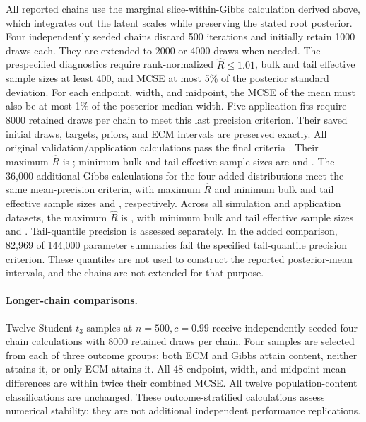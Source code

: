 \documentclass[11pt]{article}
\begin{document}
All reported chains use the marginal slice-within-Gibbs calculation derived
above, which integrates out the latent scales while preserving the stated
root posterior. Four independently seeded chains discard 500 iterations
and initially retain 1000 draws each. They are extended to 2000 or 4000
draws when needed. The prespecified diagnostics require rank-normalized
\(\widehat R\le1.01\), bulk and tail effective sample sizes at least 400,
and MCSE at most 5\% of the posterior standard deviation. For each endpoint,
width, and midpoint, the MCSE of the mean must also be at most 1\% of the
posterior median width. Five application fits require 8000 retained draws per
chain to meet this last precision criterion. Their saved initial draws,
targets, priors, and ECM intervals are preserved exactly.
All \MTIFullDatasets{} original validation/application calculations pass the final
criteria \citep{VehtariEtAl2021Rhat}. Their maximum \(\widehat R\) is \MTIFullRhat{}; minimum bulk and
tail effective sample sizes are \MTIFullBulkESS{} and \MTIFullTailESS{}.
The 36,000 additional Gibbs calculations for the four added distributions
meet the same mean-precision criteria, with maximum \(\widehat R\)
\MTIGibbsAddedRhat{} and minimum bulk and tail effective sample sizes
\MTIGibbsAddedBulkESS{} and \MTIGibbsAddedTailESS{}, respectively.
Across all \MTIGibbsAssessedDatasets{} simulation and application datasets,
the maximum \(\widehat R\) is \MTIGibbsAllRhat{}, with minimum bulk and tail
effective sample sizes \MTIGibbsAllBulkESS{} and \MTIGibbsAllTailESS{}.
Tail-quantile precision is assessed separately. In the added comparison,
82,969 of 144,000 parameter summaries fail the specified tail-quantile
precision criterion. These quantiles are not used to construct the reported
posterior-mean intervals, and the chains are not extended for that purpose.

\paragraph{Longer-chain comparisons.}
Twelve Student \(t_3\) samples at \(n=500,c=0.99\) receive independently
seeded four-chain calculations with 8000 retained draws per chain.
Four samples are selected from each of three outcome groups: both ECM and
Gibbs attain content, neither attains it, or only ECM attains it.
All 48 endpoint, width, and midpoint mean differences are within twice
their combined MCSE. All twelve population-content classifications are
unchanged. These outcome-stratified calculations assess numerical stability;
they are not additional independent performance replications.
\end{document}
